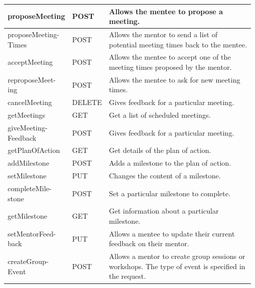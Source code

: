 \documentclass[10pt]{article}
\begin{document}
\begin{longtable}{|p{0.128\linewidth}|p{0.08\linewidth}|p{0.75\linewidth}|}
    proposeMeeting
    &
    POST
    &
    Allows the mentee to propose a meeting.
    \\ \hline

    proposeMeeting- Times
    &
    POST
    &
    Allows the mentor to send a list of potential meeting times back to the mentee.
    \\ \hline

    acceptMeeting
    &
    POST
    &
    Allows the mentee to accept one of the meeting times proposed by the mentor.
    \\ \hline

    reproposeMeet- ing
    &
    POST
    &
    Allows the mentee to ask for new meeting times.
    \\ \hline

    cancelMeeting
    &
    DELETE
    &
    Gives feedback for a particular meeting.
    \\ \hline

    getMeetings
    &
    GET
    &
    Get a list of scheduled meetings.
    \\ \hline

    giveMeeting- Feedback
    &
    POST
    &
    Gives feedback for a particular meeting.
    \\ \hline

    getPlanOfAction
    &
    GET
    &
    Get details of the plan of action.
    \\ \hline

    addMilestone
    &
    POST
    &
    Adds a milestone to the plan of action.
    \\ \hline

    setMilestone
    &
    PUT
    &
    Changes the content of a milestone.
    \\ \hline

    completeMile- stone
    &
    POST
    &
    Set a particular milestone to complete.
    \\ \hline

    getMilestone
    &
    GET
    &
    Get information about a particular milestone.
    \\ \hline

    setMentorFeed- back
    &
    PUT
    &
    Allows a mentee to update their current feedback on their mentor.
    \\ \hline

    createGroup- Event
    &
    POST
    &
    Allows a mentor to create group sessions or workshops. The type of event is specified in the request.
    \\ \hline


\end{longtable}
\end{document}
